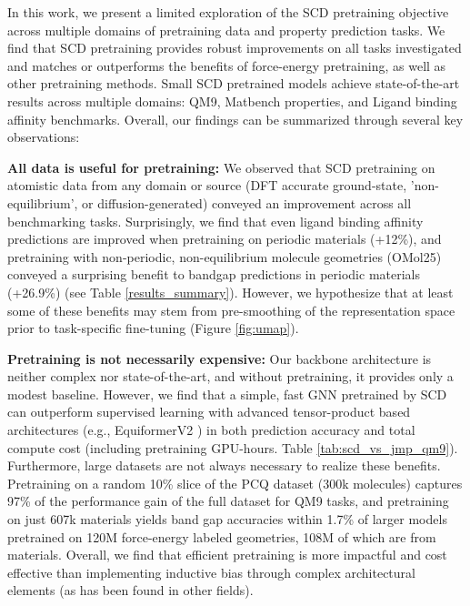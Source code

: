 
In this work, we present a limited exploration of the SCD pretraining objective across multiple domains of pretraining data and property prediction tasks.  We find that SCD pretraining provides robust improvements on all tasks investigated and matches or outperforms the benefits of force-energy pretraining, as well as other pretraining methods. Small SCD pretrained models achieve state-of-the-art results across multiple domains: QM9,  Matbench properties, and Ligand binding affinity benchmarks. Overall, our findings can be summarized through several key observations:

\textbf{All data is useful for pretraining:} We observed that SCD pretraining on atomistic data from any domain or source (DFT accurate ground-state, 'non-equilibrium', or diffusion-generated) conveyed an improvement across all benchmarking tasks. Surprisingly, we find that even ligand binding affinity predictions are improved when pretraining on periodic materials (+12\%), and pretraining with non-periodic, non-equilibrium molecule geometries (OMol25) conveyed a surprising benefit to bandgap predictions in periodic materials (+26.9\%) (see Table \ref{results_summary}). However, we hypothesize that at least some of these benefits may stem from pre-smoothing of the representation space prior to task-specific fine-tuning (Figure \ref{fig:umap}).

\textbf{Pretraining is not necessarily expensive:}
Our backbone architecture is neither complex nor state-of-the-art, and without pretraining, it provides only a modest baseline. However, we find that a simple, fast GNN pretrained by SCD can outperform supervised learning with advanced tensor-product based architectures (e.g., EquiformerV2 \cite{EquiformerV2_Liao2023}) in both prediction accuracy and total compute cost (including pretraining GPU-hours. Table \ref{tab:scd_vs_jmp_qm9}).  Furthermore, large datasets are not always necessary to realize these benefits. Pretraining on a random 10\% slice of the PCQ dataset (300k molecules) captures 97\% of the performance gain of the full dataset for QM9 tasks, and pretraining on just 607k materials yields band gap accuracies within 1.7\% of larger models pretrained on 120M force-energy labeled geometries, 108M of which are from materials. Overall, we find that efficient pretraining is more impactful and cost effective than implementing inductive bias through complex architectural elements (as has been found in other fields). 

